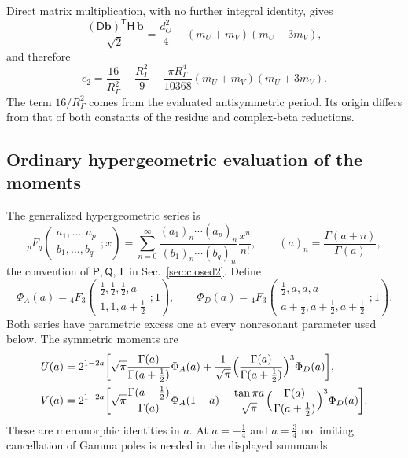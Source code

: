\documentclass[11pt,a4paper]{article}
\numberwithin{equation}{section}
\newcommand{\pFq}[3]{{}_4F_3\!\left(\begin{matrix}#1\\[1pt]#2\end{matrix};#3\right)}
\begin{document}
Direct matrix multiplication, with no further integral identity, gives
\begin{equation}
 \frac{(\mathsf D\mathbf b)^{\mathsf T}\mathsf H\,\mathbf b}{\sqrt2}=\frac{d_O^2}{4}-(m_U+m_V)(m_U+3m_V),
\end{equation}
and therefore
\begin{equation}
 c_2=\frac{16}{R_\Gamma^2}-\frac{R_\Gamma^2}{9}-\frac{\pi R_\Gamma^4}{10368}(m_U+m_V)(m_U+3m_V).
 \label{eq:cform:c2fg}
\end{equation}
The term $16/R_\Gamma^2$ comes from the evaluated antisymmetric period. Its origin differs from that of both constants
of the residue and complex-beta reductions.

\subsection{Ordinary hypergeometric evaluation of the moments}\label{app:cform:hypergeometric}
The generalized hypergeometric series is~\cite{NIST:DLMF}
\begin{equation}
 {}_pF_q\!\left(\begin{matrix}a_1,\ldots,a_p\\b_1,\ldots,b_q\end{matrix};x\right)
 =\sum_{n=0}^\infty\frac{(a_1)_n\cdots(a_p)_n}{(b_1)_n\cdots(b_q)_n}\frac{x^n}{n!},\qquad(a)_n=\frac{\Gamma(a+n)}{\Gamma(a)},
\end{equation}
the convention of $\mathsf P,\mathsf Q,\mathsf T$ in Sec.~\ref{sec:closed2}. Define
\begin{equation}
 \Phi_A(a)=\pFq{\frac12,\frac12,\frac12,a}{1,1,a+\frac12}{1},\qquad
 \Phi_D(a)=\pFq{\frac12,a,a,a}{a+\frac12,a+\frac12,a+\frac12}{1}.
\end{equation}
Both series have parametric excess one at every nonresonant parameter used below. The symmetric moments are
\begin{align}
 U(a)&=2^{1-2a}\biggl[\sqrt\pi\frac{\Gamma(a)}{\Gamma(a+\frac12)}\Phi_A(a)
 +\frac1{\sqrt\pi}\Bigl(\frac{\Gamma(a)}{\Gamma(a+\frac12)}\Bigr)^3\Phi_D(a)\biggr],
 \label{eq:cform:U}\\
 V(a)&=2^{1-2a}\biggl[\sqrt\pi\frac{\Gamma(a-\frac12)}{\Gamma(a)}\Phi_A(1-a)
 +\frac{\tan\pi a}{\sqrt\pi}\Bigl(\frac{\Gamma(a)}{\Gamma(a+\frac12)}\Bigr)^3\Phi_D(a)\biggr].
 \label{eq:cform:V}
\end{align}
These are meromorphic identities in $a$. At $a=-\frac14$ and $a=\frac34$ no limiting cancellation of Gamma poles is
needed in the displayed summands.
\end{document}
